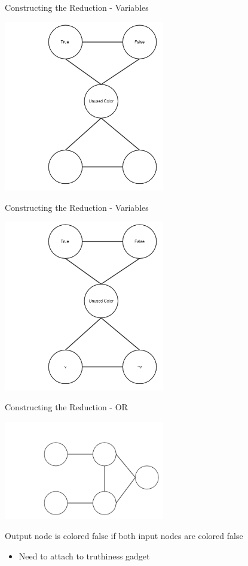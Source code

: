 \documentclass[bigger]{beamer}
\begin{document}
\begin{frame}[label=sec-8]{Constructing the Reduction - Variables}
\begin{center}
\includegraphics[width=7cm]{Variable1.png}
\end{center}
\end{frame}

\begin{frame}[label=sec-9]{Constructing the Reduction - Variables}
\begin{center}
\includegraphics[width=7cm]{Variable2.png}
\end{center}
\end{frame}

\begin{frame}[label=sec-10]{Constructing the Reduction - OR}
\begin{center}
\includegraphics[width=7cm]{Or1.png}
\end{center}

Output node is colored false if both input nodes are colored false
\begin{itemize}
\item <1-> Need to attach to truthiness gadget
\end{itemize}
\end{frame}
\end{document}
